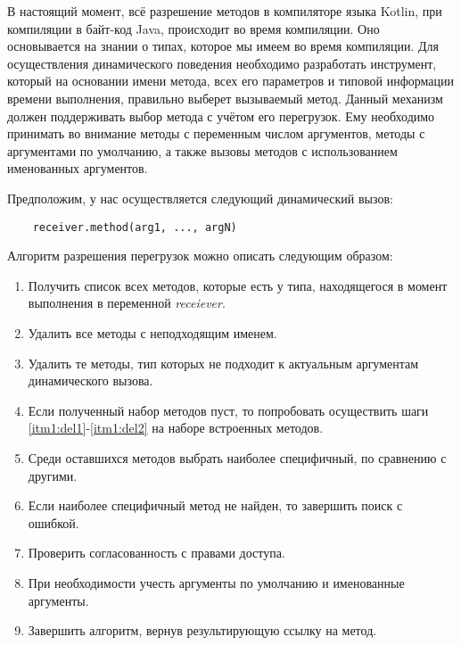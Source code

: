 В настоящий момент, всё разрешение методов в компиляторе языка Kotlin, при компиляции в байт-код Java, происходит во время компиляции. Оно основывается на знании о типах, которое мы имеем во время компиляции. Для осуществления динамического поведения необходимо разработать инструмент, который на основании имени метода, всех его параметров и типовой информации времени
выполнения, правильно выберет вызываемый метод. Данный механизм должен поддерживать выбор метода с учётом его перегрузок. Ему необходимо принимать во внимание методы с переменным числом аргументов, методы с аргументами по умолчанию, а также вызовы методов с использованием именованных аргументов.

Предположим, у нас осуществляется следующий динамический вызов:

\begin{verbatim}
    receiver.method(arg1, ..., argN)
\end{verbatim}

Алгоритм разрешения перегрузок можно описать следующим образом:

\begin{enumerate}
    \item Получить список всех методов, которые есть у типа, находящегося в момент выполнения в переменной \textit{receiever}.
    \item Удалить все методы с неподходящим именем.\label{itm1:del1}
    \item Удалить те методы, тип которых не подходит к актуальным аргументам динамического вызова.\label{itm1:del2}
    \item Если полученный набор методов пуст, то попробовать осуществить шаги \ref{itm1:del1}-\ref{itm1:del2} на наборе встроенных методов.
    \item Среди оставшихся методов выбрать наиболее специфичный, по сравнению с другими.
    \item Если наиболее специфичный метод не найден, то завершить поиск с ошибкой.
    \item Проверить согласованность с правами доступа.
    \item При необходимости учесть аргументы по умолчанию и именованные аргументы.
    \item Завершить алгоритм, вернув результирующую ссылку на метод.
\end{enumerate}

